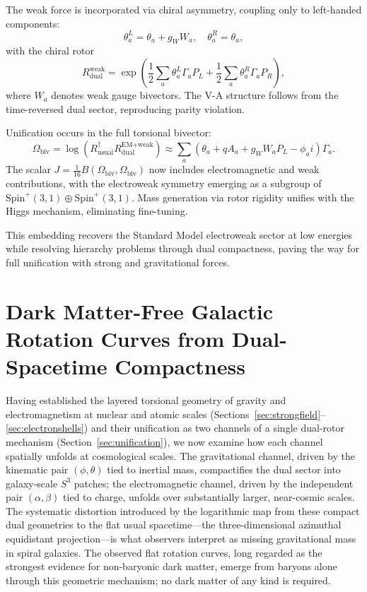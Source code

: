 \documentclass[dvipdfmx,a4paper]{article}
\begin{document}
The weak force is incorporated via chiral asymmetry, coupling only to left-handed components:
\[
\theta_a^L = \theta_a + g_W W_a, \quad \theta_a^R = \theta_a,
\]
with the chiral rotor
\[
R_{\text{dual}}^{\text{weak}} = \exp\left( \frac{1}{2} \sum_a \theta_a^L \Gamma_a P_L + \frac{1}{2} \sum_a \theta_a^R \Gamma_a P_R \right),
\]
where $W_a$ denotes weak gauge bivectors. The V-A structure follows from the time-reversed dual sector, reproducing parity violation.

Unification occurs in the full torsional bivector:
\[
\Omega_{\text{biv}} = \log\left( R_{\text{usual}}^\dagger R_{\text{dual}}^{\text{EM+weak}} \right) \approx \sum_a (\theta_a + q A_a + g_W W_a P_L - \phi_a i) \Gamma_a.
\]
The scalar $J = \frac{1}{16} B(\Omega_{\text{biv}}, \Omega_{\text{biv}})$ now includes electromagnetic and weak contributions, with the electroweak symmetry emerging as a subgroup of $\mathrm{Spin}^+(3,1) \oplus \mathrm{Spin}^+(3,1)$. Mass generation via rotor rigidity unifies with the Higgs mechanism, eliminating fine-tuning.

This embedding recovers the Standard Model electroweak sector at low energies while resolving hierarchy problems through dual compactness, paving the way for full unification with strong and gravitational forces.

\section{Dark Matter-Free Galactic Rotation Curves from Dual-Spacetime Compactness}
\label{sec:darkmatter}

Having established the layered torsional geometry of gravity and electromagnetism at nuclear and atomic scales (Sections~\ref{sec:strongfield}--\ref{sec:electronshells}) and their unification as two channels of a single dual-rotor mechanism (Section~\ref{sec:unification}), we now examine how each channel spatially unfolds at cosmological scales. The gravitational channel, driven by the kinematic pair $(\phi, \theta)$ tied to inertial mass, compactifies the dual sector into galaxy-scale $S^3$ patches; the electromagnetic channel, driven by the independent pair $(\alpha, \beta)$ tied to charge, unfolds over substantially larger, near-cosmic scales. The systematic distortion introduced by the logarithmic map from these compact dual geometries to the flat usual spacetime---the three-dimensional azimuthal equidistant projection---is what observers interpret as missing gravitational mass in spiral galaxies. The observed flat rotation curves, long regarded as the strongest evidence for non-baryonic dark matter, emerge from baryons alone through this geometric mechanism; no dark matter of any kind is required.
\end{document}
